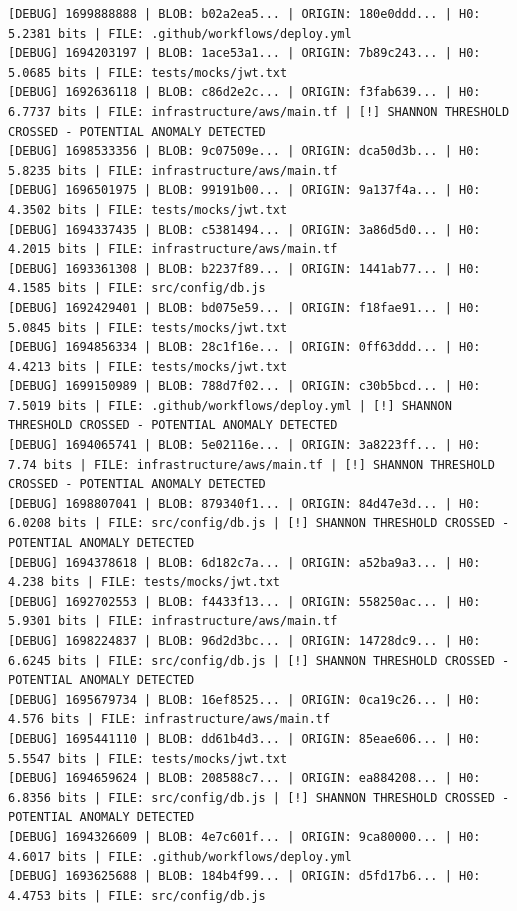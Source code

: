 \documentclass[12pt, a4paper, oneside]{report}
\begin{document}
\begin{lstlisting}[basicstyle=\tiny\ttfamily]
[DEBUG] 1699888888 | BLOB: b02a2ea5... | ORIGIN: 180e0ddd... | H0: 5.2381 bits | FILE: .github/workflows/deploy.yml
[DEBUG] 1694203197 | BLOB: 1ace53a1... | ORIGIN: 7b89c243... | H0: 5.0685 bits | FILE: tests/mocks/jwt.txt
[DEBUG] 1692636118 | BLOB: c86d2e2c... | ORIGIN: f3fab639... | H0: 6.7737 bits | FILE: infrastructure/aws/main.tf | [!] SHANNON THRESHOLD CROSSED - POTENTIAL ANOMALY DETECTED
[DEBUG] 1698533356 | BLOB: 9c07509e... | ORIGIN: dca50d3b... | H0: 5.8235 bits | FILE: infrastructure/aws/main.tf
[DEBUG] 1696501975 | BLOB: 99191b00... | ORIGIN: 9a137f4a... | H0: 4.3502 bits | FILE: tests/mocks/jwt.txt
[DEBUG] 1694337435 | BLOB: c5381494... | ORIGIN: 3a86d5d0... | H0: 4.2015 bits | FILE: infrastructure/aws/main.tf
[DEBUG] 1693361308 | BLOB: b2237f89... | ORIGIN: 1441ab77... | H0: 4.1585 bits | FILE: src/config/db.js
[DEBUG] 1692429401 | BLOB: bd075e59... | ORIGIN: f18fae91... | H0: 5.0845 bits | FILE: tests/mocks/jwt.txt
[DEBUG] 1694856334 | BLOB: 28c1f16e... | ORIGIN: 0ff63ddd... | H0: 4.4213 bits | FILE: tests/mocks/jwt.txt
[DEBUG] 1699150989 | BLOB: 788d7f02... | ORIGIN: c30b5bcd... | H0: 7.5019 bits | FILE: .github/workflows/deploy.yml | [!] SHANNON THRESHOLD CROSSED - POTENTIAL ANOMALY DETECTED
[DEBUG] 1694065741 | BLOB: 5e02116e... | ORIGIN: 3a8223ff... | H0: 7.74 bits | FILE: infrastructure/aws/main.tf | [!] SHANNON THRESHOLD CROSSED - POTENTIAL ANOMALY DETECTED
[DEBUG] 1698807041 | BLOB: 879340f1... | ORIGIN: 84d47e3d... | H0: 6.0208 bits | FILE: src/config/db.js | [!] SHANNON THRESHOLD CROSSED - POTENTIAL ANOMALY DETECTED
[DEBUG] 1694378618 | BLOB: 6d182c7a... | ORIGIN: a52ba9a3... | H0: 4.238 bits | FILE: tests/mocks/jwt.txt
[DEBUG] 1692702553 | BLOB: f4433f13... | ORIGIN: 558250ac... | H0: 5.9301 bits | FILE: infrastructure/aws/main.tf
[DEBUG] 1698224837 | BLOB: 96d2d3bc... | ORIGIN: 14728dc9... | H0: 6.6245 bits | FILE: src/config/db.js | [!] SHANNON THRESHOLD CROSSED - POTENTIAL ANOMALY DETECTED
[DEBUG] 1695679734 | BLOB: 16ef8525... | ORIGIN: 0ca19c26... | H0: 4.576 bits | FILE: infrastructure/aws/main.tf
[DEBUG] 1695441110 | BLOB: dd61b4d3... | ORIGIN: 85eae606... | H0: 5.5547 bits | FILE: tests/mocks/jwt.txt
[DEBUG] 1694659624 | BLOB: 208588c7... | ORIGIN: ea884208... | H0: 6.8356 bits | FILE: src/config/db.js | [!] SHANNON THRESHOLD CROSSED - POTENTIAL ANOMALY DETECTED
[DEBUG] 1694326609 | BLOB: 4e7c601f... | ORIGIN: 9ca80000... | H0: 4.6017 bits | FILE: .github/workflows/deploy.yml
[DEBUG] 1693625688 | BLOB: 184b4f99... | ORIGIN: d5fd17b6... | H0: 4.4753 bits | FILE: src/config/db.js

\end{lstlisting}
\end{document}

